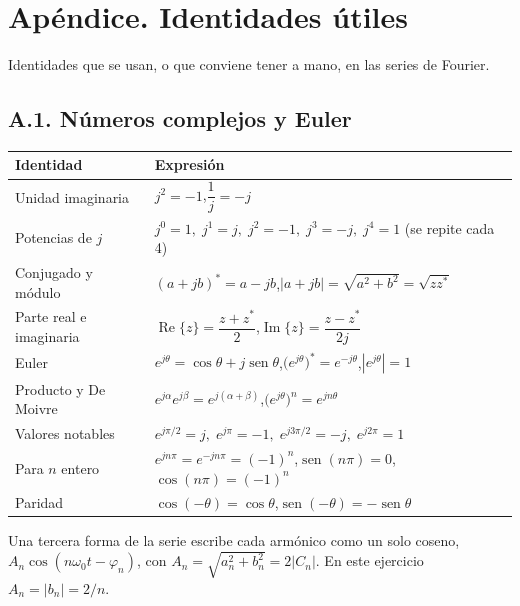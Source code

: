 \documentclass[11pt,a4paper]{article}
\DeclareMathOperator{\sen}{sen}
\DeclareMathOperator{\Real}{Re}
\DeclareMathOperator{\Imag}{Im}
\begin{document}
\section*{Apéndice. Identidades útiles}
Identidades que se usan, o que conviene tener a mano, en las series de Fourier.

\subsection*{A.1. Números complejos y Euler}
\begin{table}[H]
\centering
\renewcommand{\arraystretch}{1.45}
\begin{tabularx}{\textwidth}{>{\raggedright\arraybackslash}p{4.4cm}X}
\toprule
\textbf{Identidad} & \textbf{Expresión}\\
\midrule
Unidad imaginaria & $j^{2}=-1$,\quad $\dfrac{1}{j}=-j$\\
Potencias de $j$ & $j^{0}=1,\;j^{1}=j,\;j^{2}=-1,\;j^{3}=-j,\;j^{4}=1$ (se repite cada 4)\\
Conjugado y módulo & $(a+jb)^{*}=a-jb$,\quad $|a+jb|=\sqrt{a^{2}+b^{2}}=\sqrt{zz^{*}}$\\
Parte real e imaginaria & $\Real\{z\}=\dfrac{z+z^{*}}{2}$,\quad $\Imag\{z\}=\dfrac{z-z^{*}}{2j}$\\
Euler & $e^{j\theta}=\cos\theta+j\sen\theta$,\quad $\big(e^{j\theta}\big)^{*}=e^{-j\theta}$,\quad $|e^{j\theta}|=1$\\
Producto y De Moivre & $e^{j\alpha}e^{j\beta}=e^{j(\alpha+\beta)}$,\quad $\big(e^{j\theta}\big)^{n}=e^{jn\theta}$\\
Valores notables & $e^{j\pi/2}=j,\;e^{j\pi}=-1,\;e^{j3\pi/2}=-j,\;e^{j2\pi}=1$\\
Para $n$ entero & $e^{jn\pi}=e^{-jn\pi}=(-1)^{n}$,\quad $\sen(n\pi)=0$,\quad $\cos(n\pi)=(-1)^{n}$\\
Paridad & $\cos(-\theta)=\cos\theta$,\quad $\sen(-\theta)=-\sen\theta$\\
\bottomrule
\end{tabularx}
\end{table}
Una tercera forma de la serie escribe cada armónico como un solo coseno,
$A_n\cos(n\omega_0t-\varphi_n)$, con $A_n=\sqrt{a_n^{2}+b_n^{2}}=2|C_n|$. En este ejercicio
$A_n=|b_n|=2/n$.
\end{document}
